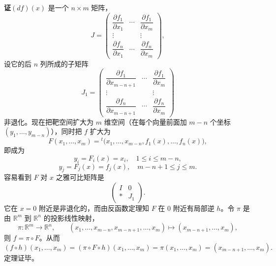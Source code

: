 \noindent\textbf{证}\quad $(df)(x)$ 是一个 $n\times m$ 矩阵，
\[
 J=
 \begin{pmatrix}
  \dfrac{\partial f_1}{\partial x_1}&\cdots&\dfrac{\partial f_1}{\partial x_m}\\
  \vdots&&\vdots\\
  \dfrac{\partial f_n}{\partial x_1}&\cdots&\dfrac{\partial f_n}{\partial x_m}
 \end{pmatrix},
\]
设它的后 $n$ 列所成的子矩阵
\[
 J_1=
 \begin{pmatrix}
  \dfrac{\partial f_1}{\partial x_{m-n+1}}&\cdots&\dfrac{\partial f_1}{\partial x_m}\\
  \vdots&&\vdots\\
  \dfrac{\partial f_n}{\partial x_{m-n+1}}&\cdots&\dfrac{\partial f_n}{\partial x_m}
 \end{pmatrix}
\]
非退化。现在把靶空间扩大为 $m$ 维空间（在每个向量前面加 $m-n$ 个坐标 $(y_1,\ldots,y_{m-n})$），同时把 $f$ 扩大为
\[
 F(x_1,\ldots,x_m)
 ={}^t\bigl(x_1,\ldots,x_{m-n},f_1(x),\ldots,f_n(x)\bigr),
\]
即成为
\[
 y_i=F_i(x)=x_i,\quad 1\le i\le m-n,
\]
\[
 y_j=F_j(x)=f_j(x),\quad m-n+1\le j\le m.
\]
容易看到 $F$ 对 $x$ 之雅可比矩阵是
\[
 \begin{pmatrix}I&0\\ *&J_1\end{pmatrix}.
\]
它在 $x=0$ 附近是非退化的，而由反函数定理知 $F$ 在 $0$ 附近有局部逆 $h$。令 $\pi$ 是由 $\mathbb R^m$ 到 $\mathbb R^n$ 的投影线性映射，
\[
 \pi:\mathbb R^m\to\mathbb R^n,
 \qquad
 (x_1,\ldots,x_{m-n},x_{m-n+1},\ldots,x_m)
 \longmapsto(x_{m-n+1},\ldots,x_m),
\]
则 $f=\pi\circ F$。从而
\[
 (f\circ h)(x_1,\ldots,x_m)
 =(\pi\circ F\circ h)(x_1,\ldots,x_m)
 =\pi(x_1,\ldots,x_m)
 =(x_{m-n+1},\ldots,x_m).
\]
定理证毕。

